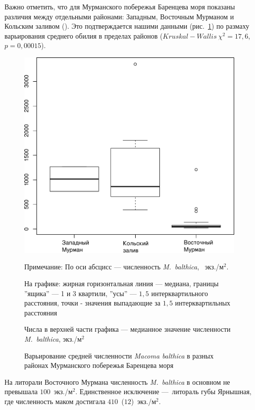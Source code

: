 Важно отметить, что для Мурманского побережья Баренцева моря показаны различия между отдельными районами: Западным, Восточным Мурманом и Кольским заливом (\cite{Guryanova_Ushakov_1929, Guryanova_et_al_1930}). 
Это подтверждается нашими данными (рис.~\ref{ris:N_region_Barents}) по размаху варьирования среднего обилия в пределах районов ($Kruskal-Wallis\ \chi^2 = 17,6$, $p = 0,00015$).
%
	\begin{figure}[hp]
	\begin{center}
		\includegraphics[height=0.5\textheight]{../All_N/Nmean_region_Barents1.pdf}
	\end{center}
	\caption{Варьирование средней численности {\it Macoma balthica} в разных районах Мурманского побережья Баренцева моря}
	{\footnotesize Примечание: По оси абсцисс --- численность {\it M.~balthica}, ~экз./м$^2$.

	На графике: жирная горизонтальная линия --- медиана, границы ''ящика'' --- 1 и 3 квартили, ''усы'' --- $1,5$ интерквартильного расстояния, точки - значения выпадающие за $1,5$ интерквартильных расстояния

Числа в верхней части графика --- медианное значение численности {\it M.~balthica}, экз./м$^2$}
	\label{ris:N_region_Barents}
	\end{figure}
%
На литорали Восточного Мурмана численность {\it M.~balthica} в основном не превышала $100$~экз./м$^2$. 
Единственное исключение ---\ литораль губы Ярнышная, где численность маком достигала $410$~($12$)~экз./м$^2$. 
